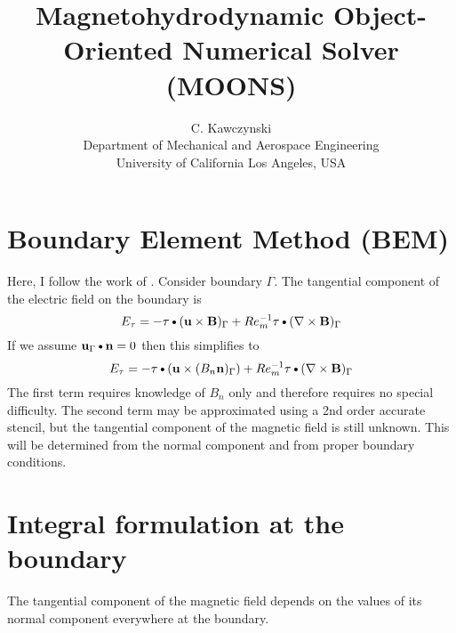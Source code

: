 \documentclass[11pt]{article}
\newcommand{\myBullet}{\text{\textbullet}}
\begin{document}
\doublespacing
\title{Magnetohydrodynamic Object-Oriented Numerical Solver (MOONS)}
\author{C. Kawczynski \\
Department of Mechanical and Aerospace Engineering \\
University of California Los Angeles, USA\\
}

\section{Boundary Element Method (BEM)}
Here, I follow the work of \cite{Iskakov2004}. Consider boundary $\Gamma$. The tangential component of the electric field on the boundary is
\begin{equation}
  E_{\tau} = -\mathbf{\tau} \myBullet (\mathbf{u} \times \mathbf{B})_{\Gamma} + 
  Re_m^{-1} \mathbf{\tau} \myBullet (\nabla \times \mathbf{B})_{\Gamma}
\end{equation}
If we assume $\mathbf{u}_{\Gamma} \myBullet \mathbf{n} = 0$ then this simplifies to
\begin{equation}
  E_{\tau} = -\mathbf{\tau} \myBullet (\mathbf{u} \times (B_n \mathbf{n})_{\Gamma}) + 
  Re_m^{-1} \mathbf{\tau} \myBullet (\nabla \times \mathbf{B})_{\Gamma}
\end{equation}
The first term requires knowledge of $B_n$ only and therefore requires no special difficulty. The second term may be approximated using a 2nd order accurate stencil, but the tangential component of the magnetic field is still unknown. This will be determined from the normal component and from proper boundary conditions.
\section{Integral formulation at the boundary}
The tangential component of the magnetic field depends on the values of its normal component everywhere at the boundary.
\end{document}
